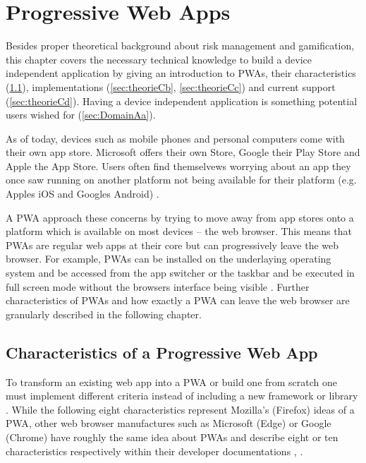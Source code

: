\section{Progressive Web Apps}
\label{sec:theorieC}

Besides proper theoretical background about risk management and gamification, this chapter covers the necessary technical knowledge to build a device independent application by giving an introduction to \acl{PWA}s, their characteristics (\ref{sec:theorieCa}), implementations (\ref{sec:theorieCb}, \ref{sec:theorieCc}) and current support (\ref{sec:theorieCd}). Having a device independent application is something potential users wished for (\ref{sec:DomainAa}). 

As of today, devices such as mobile phones and personal computers come with their own app store. Microsoft offers their own Store, Google their Play Store and Apple the App Store. Users often find themselvews worrying about an app they once saw running on another platform not being available for their platform (e.g. Apples iOS and Googles Android) \cite[p. 3]{sheppardBeginningProgressiveWeb2017}.

A \ac{PWA} approach these concerns by trying to move away from app stores onto a platform which is available on most devices – the web browser. This means that \acs{PWA}s are regular web apps at their core but can progressively leave the web browser. For example, \acs{PWA}s can be installed on the underlaying operating system and be accessed from the app switcher or the taskbar and be executed in full screen mode without the browsers interface being visible \cite[p. 26]{liebelProgressiveWebApps2019}. Further characteristics of  \acs{PWA}s and how exactly a  \acs{PWA} can leave the web browser are granularly described in the following chapter.


\subsection{Characteristics of a Progressive Web App}
\label{sec:theorieCa}


To transform an existing web app into a  \acs{PWA} or build one from scratch one must implement different criteria instead of including a new framework or library \cite[p. 6]{sheppardBeginningProgressiveWeb2017}.
While the following eight characteristics represent Mozilla’s (Firefox) ideas of a  \acs{PWA}, other web browser manufactures such as Microsoft (Edge) or Google (Chrome) have roughly the same idea about  \acs{PWA}s and describe eight or ten characteristics respectively within their developer documentations \cite[p. 90]{liebelProgressiveWebApps2019}, \cite{ProgressiveWebApps}.

